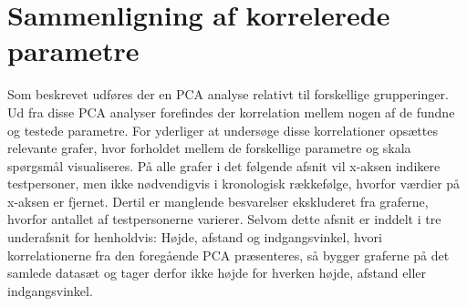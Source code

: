 \section{Sammenligning af korrelerede parametre}
\label{DatabehandlingSammenligningKorrelerede}
%
Som beskrevet udføres der en PCA analyse relativt til forskellige grupperinger. Ud fra disse PCA analyser forefindes der korrelation mellem nogen af de fundne og testede parametre. For yderliger at undersøge disse korrelationer opsættes relevante grafer, hvor forholdet mellem de forskellige parametre og skala spørgsmål visualiseres. På alle grafer i det følgende afsnit vil x-aksen indikere testpersoner, men ikke nødvendigvis i kronologisk rækkefølge, hvorfor værdier på x-aksen er fjernet. Dertil er manglende besvarelser ekskluderet fra graferne, hvorfor antallet af testpersonerne varierer. Selvom dette afsnit er inddelt i tre underafsnit for henholdvis: Højde, afstand og indgangsvinkel, hvori korrelationerne fra den foregående PCA præsenteres, så bygger graferne på det samlede datasæt og tager derfor ikke højde for hverken højde, afstand eller indgangsvinkel.  

